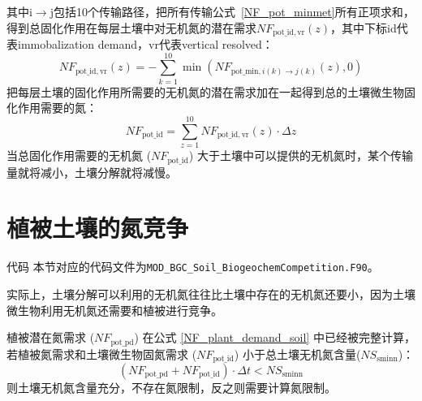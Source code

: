 其中$\mathrm {i \rightarrow j}$包括10个传输路径，把所有传输公式~\eqref{NF_pot_minmet}所有正项求和，得到总固化作用在每层土壤中对无机氮的潜在需求$NF_{\mathrm{pot\_id,vr}}(z)$，其中下标id代表immobalization demand，vr代表vertical resolved：
\begin{equation}\label{NF_immob_demand_vr}
  NF_{\mathrm{pot\_id,vr}}(z)=-\sum_{k=1}^{10}\min{\left(NF_{\mathrm{pot\_min},i(k)\rightarrow j(k)}\left(z\right), 0\right)}
\end{equation}
把每层土壤的固化作用所需要的无机氮的潜在需求加在一起得到总的土壤微生物固化作用需要的氮：
\begin{equation}
    NF_{\mathrm{pot\_id}}=\sum_{z=1}^{10}{NF_{\mathrm{pot\_id,vr}}(z) \cdot \Delta z}
\end{equation}
当总固化作用需要的无机氮 ($NF_{\mathrm{pot\_id}}$) 大于土壤中可以提供的无机氮时，某个传输量就将减小，土壤分解就将减慢。


\section{植被土壤的氮竞争}\label{植被土壤的氮竞争}
\begin{mymdframed}{代码}
  本节对应的代码文件为\texttt{MOD\_BGC\_Soil\_BiogeochemCompetition.F90}。
\end{mymdframed}

实际上，土壤分解可以利用的无机氮往往比土壤中存在的无机氮还要小，因为土壤微生物利用无机氮还需要和植被进行竞争。

植被潜在氮需求 ($NF_{\mathrm{pot\_{pd}}}$) 在公式 \eqref{NF_plant_demand_soil} 中已经被完整计算，若植被氮需求和土壤微生物固氮需求 ($NF_{\mathrm{pot\_{id}}}$) 小于总土壤无机氮含量(${NS}_{\mathrm{sminn}}$)：
\begin{equation}
  \left(NF_{\mathrm{pot\_{pd}}}+NF_{\mathrm{pot\_id}}\right)\cdot\Delta t<NS_{\mathrm{sminn}}
\end{equation}
则土壤无机氮含量充分，不存在氮限制，反之则需要计算氮限制。

